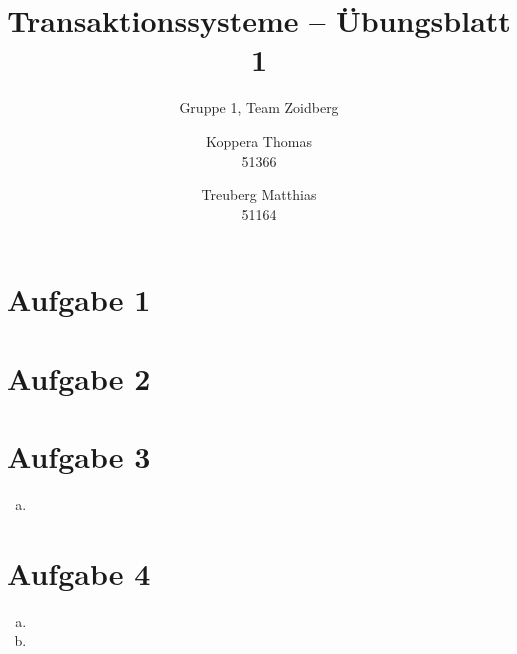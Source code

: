 \documentclass{scrartcl}
\title{Transaktionssysteme -- Übungsblatt 1}
\subtitle{Gruppe 1, Team Zoidberg}
\author{Koppera Thomas \\ 51366
 \and Treuberg Matthias \\ 51164}
\date{ }
\begin{document}
  \maketitle
  
\section*{Aufgabe 1}

\section*{Aufgabe 2}


\section*{Aufgabe 3}

\begin{enumerate}[a)]
\item

\end{enumerate}

\section*{Aufgabe 4}
\begin{enumerate}[a)]
\item
\item
\end{enumerate}
\end{document}
